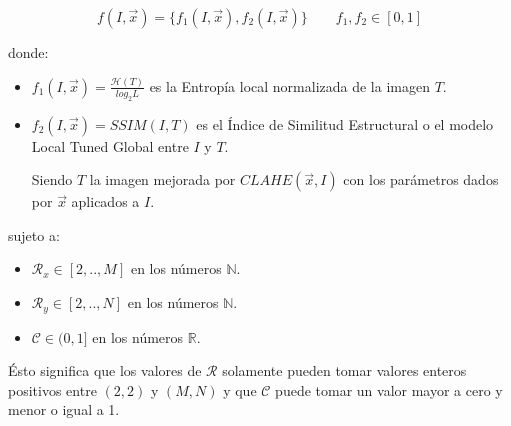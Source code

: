 \documentclass[spanish,twocolumn]{article}
\begin{document}
\begin{equation}\label{eq:fitness}
    f(I, \overrightarrow{x}) = \{ f_1(I, \overrightarrow{x}), f_2(I, \overrightarrow{x}) \} \qquad f_1,f_2 \in [0,1]
\end{equation}

donde:
\begin{itemize}
\item $f_{1}(I, \overrightarrow{x})=\frac{\mathscr{H}(T)}{log_{2}L}$ es la Entropía local normalizada de la imagen $T$.
\item $f_{2}(I, \overrightarrow{x})=SSIM(I,T)$ es el Índice de Similitud Estructural o  el modelo Local Tuned Global  entre $I$ y $T$.

Siendo $T$ la imagen mejorada por $CLAHE(\overrightarrow{x},I)$ con los parámetros dados por $\overrightarrow{x}$ aplicados a $I$.

\end{itemize}

sujeto a:

\begin{itemize}
\item $\mathcal{R}_x \in [2,..,M]$ en los números $\mathbb{N}$.
\item $\mathcal{R}_y \in [2,..,N]$ en los números $\mathbb{N}$.
\item $\mathscr{C} \in (0,1]$ en los números $\mathbb{R}$.
\end{itemize}

Ésto significa que los valores de $\mathcal{R}$ solamente pueden tomar valores enteros positivos entre $(2,2)$ y $(M,N)$ y que $\mathscr{C}$ puede tomar un valor mayor a cero y menor o igual a 1.
\end{document}

